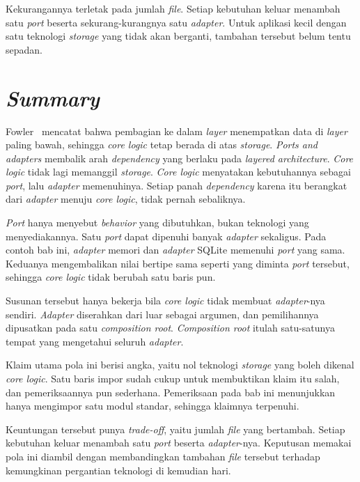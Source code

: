 Kekurangannya terletak pada jumlah \textit{file}. Setiap kebutuhan keluar
menambah satu \textit{port} beserta sekurang-kurangnya satu \textit{adapter}.
Untuk aplikasi kecil dengan satu teknologi \textit{storage} yang tidak akan
berganti, tambahan tersebut belum tentu sepadan.

\section{\textit{Summary}}

Fowler~\cite{fowler2015layering} mencatat bahwa pembagian ke dalam \textit{layer} menempatkan
data di \textit{layer} paling bawah, sehingga \textit{core logic} tetap berada
di atas \textit{storage}. \textit{Ports and adapters} membalik arah
\textit{dependency} yang berlaku pada \textit{layered architecture}.
\textit{Core logic} tidak lagi memanggil \textit{storage}. \textit{Core logic}
menyatakan kebutuhannya sebagai \textit{port}, lalu \textit{adapter}
memenuhinya. Setiap panah \textit{dependency} karena itu berangkat dari
\textit{adapter} menuju \textit{core logic}, tidak pernah sebaliknya.

\textit{Port} hanya menyebut \textit{behavior} yang dibutuhkan, bukan teknologi
yang menyediakannya. Satu \textit{port} dapat dipenuhi banyak \textit{adapter}
sekaligus. Pada contoh bab ini, \textit{adapter} memori dan \textit{adapter}
SQLite memenuhi \textit{port} yang sama. Keduanya mengembalikan nilai bertipe
sama seperti yang diminta \textit{port} tersebut, sehingga \textit{core logic}
tidak berubah satu baris pun.

Susunan tersebut hanya bekerja bila \textit{core logic} tidak membuat
\textit{adapter}-nya sendiri. \textit{Adapter} diserahkan dari luar sebagai
argumen, dan pemilihannya dipusatkan pada satu \textit{composition root}.
\textit{Composition root} itulah satu-satunya tempat yang mengetahui seluruh
\textit{adapter}.

Klaim utama pola ini berisi angka, yaitu nol teknologi \textit{storage} yang
boleh dikenal \textit{core logic}. Satu baris impor sudah cukup untuk
membuktikan klaim itu salah, dan pemeriksaannya pun sederhana. Pemeriksaan pada
bab ini menunjukkan  hanya mengimpor satu modul standar,
sehingga klaimnya terpenuhi.

Keuntungan tersebut punya \textit{trade-off}, yaitu jumlah \textit{file} yang
bertambah. Setiap kebutuhan keluar menambah satu \textit{port} beserta
\textit{adapter}-nya. Keputusan memakai pola ini diambil dengan membandingkan
tambahan \textit{file} tersebut terhadap kemungkinan pergantian teknologi di
kemudian hari.


